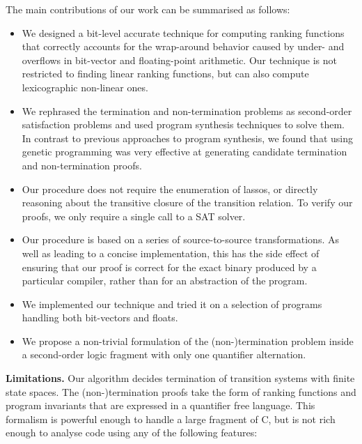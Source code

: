\documentclass[preprint]{sigplanconf}
\theoremstyle{definition}
\begin{document}
The main contributions of our work can be summarised as follows:
%
\begin{itemize}

\item We designed a bit-level accurate technique for computing ranking
functions that correctly accounts for the wrap-around behavior caused by
under- and overflows in bit-vector and floating-point arithmetic.  Our
technique is not restricted to finding linear ranking functions, but can
also compute lexicographic non-linear ones.

\item  We rephrased the termination and non-termination problems as
second-order satisfaction problems and used program synthesis techniques to
solve them.  In contrast to previous approaches to program synthesis, we
found that using genetic programming was very effective at generating
candidate termination and non-termination proofs.

\item Our procedure does not require the enumeration of lassos, or directly
reasoning about the transitive closure of the transition relation.  To
verify our proofs, we only require a single call to a SAT solver.

\item Our procedure is based on a series of source-to-source
transformations.  As well as leading to a concise implementation, this has
the side effect of ensuring that our proof is correct for the exact binary
produced by a particular compiler, rather than for an abstraction of the
program.

\item We implemented our technique and tried it on a selection of programs
handling both bit-vectors and floats.

\item We propose a non-trivial formulation of the (non-)termination problem inside a
 second-order logic fragment with only one quantifier alternation.

\end{itemize}

{\bf Limitations.}
Our algorithm decides termination of transition systems with finite state
spaces.  The (non-)termination proofs take the form of ranking functions and
program invariants that are expressed in a quantifier free language.  This
formalism is powerful enough to handle a large fragment of C, but is not
rich enough to analyse code using any of the following features:
\end{document}

